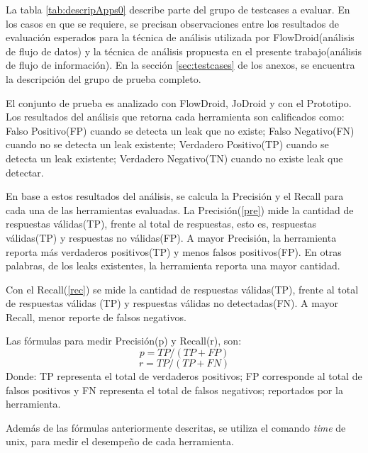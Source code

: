 La tabla \ref{tab:descripApps0} describe parte del grupo de testcases a
evaluar. En los casos en que se requiere, se precisan observaciones entre los
resultados de evaluación esperados para la técnica de análisis utilizada por
FlowDroid(análisis de flujo de datos) y la técnica de análisis propuesta en el
presente trabajo(análisis de flujo de información).
En la sección \ref{sec:testcases} de los anexos, se encuentra la
descripción del grupo de prueba completo.

El conjunto de prueba es analizado con FlowDroid, JoDroid y con el Prototipo. Los
resultados del análisis que retorna cada herramienta son calificados como:
Falso Positivo(FP) cuando se detecta un leak que no existe; Falso Negativo(FN)
cuando no se detecta un leak existente; Verdadero Positivo(TP) cuando se detecta
un leak existente; Verdadero Negativo(TN) cuando no existe leak que
detectar.

\newpage
En base a estos resultados del análisis, se calcula la Precisión y el Recall
para cada una de las herramientas evaluadas. 
La Precisión(\ref{pre}) mide la cantidad de respuestas válidas(TP), frente al
total de respuestas, esto es, respuestas válidas(TP) y respuestas no válidas(FP).
A mayor Precisión, la herramienta reporta más verdaderos positivos(TP) y menos
falsos positivos(FP). En otras palabras, de los leaks existentes, la
herramienta reporta una mayor cantidad.

Con el Recall(\ref{rec}) se mide la cantidad de respuestas válidas(TP), frente
al total de respuestas válidas (TP) y respuestas válidas no detectadas(FN). A
mayor Recall, menor reporte de falsos negativos.\newline

Las fórmulas para medir Precisión(p) y Recall(r), son:
\begin{equation}
\label{pre}
	p = TP/(TP +FP) 
\end{equation}
\begin{equation}
\label{rec}
	r = TP/(TP+FN)
\end{equation}
Donde: \newline
TP representa el total de verdaderos positivos; FP corresponde al total de
falsos positivos y  FN representa el total de falsos
negativos; reportados por la herramienta.

Además de las fórmulas anteriormente descritas, se utiliza el comando
\textit{time}\cite{time-man} de unix, para medir el desempeño de cada
herramienta.

